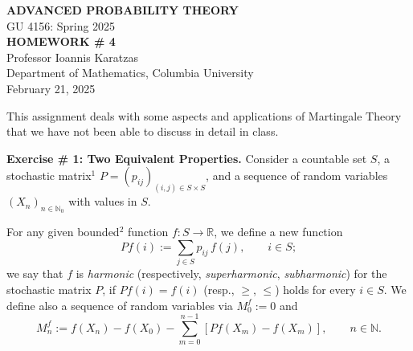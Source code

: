 \begin{center}
    \textbf{ADVANCED PROBABILITY THEORY} \\
    GU 4156: Spring 2025 \\
    \textbf{HOMEWORK \# 4} \\
    Professor Ioannis Karatzas \\
    Department of Mathematics, Columbia University \\
    February 21, 2025
\end{center}

This assignment deals with some aspects and applications of Martingale Theory that we have not been able to discuss in detail in class.

\textbf{Exercise \# 1: Two Equivalent Properties.} Consider a countable set $S$, a stochastic matrix$^1$ $P = \left(p_{ij}\right)_{(i,j) \in S \times S}$, and a sequence of random variables $\left(X_n\right)_{n \in \mathbb{N}_0}$ with values in $S$.

For any given bounded$^2$ function $f : S \to \mathbb{R}$, we define a new function
\begin{equation}
    Pf(i) := \sum_{j \in S} p_{ij}\, f(j), \qquad i \in S;
\end{equation}
we say that $f$ is \textit{harmonic} (respectively, \textit{superharmonic}, \textit{subharmonic}) for the stochastic matrix $P$, if $Pf(i) = f(i)$ (resp., $\geq$, $\leq$) holds for every $i \in S$. We define also a sequence of random variables via $M^f_0 := 0$ and
\begin{equation}
    M^f_n := f(X_n) - f(X_0) - \sum_{m=0}^{n-1} \left[Pf(X_m) - f(X_m)\right], \qquad n \in \mathbb{N}.
\end{equation}

